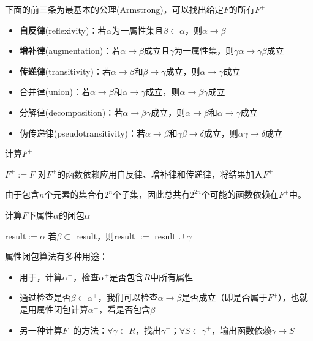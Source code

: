 \begin{theorem}[逻辑蕴含公理]
下面的前三条为最基本的公理(Armstrong)，可以找出给定$F$的所有$F^+$
\begin{itemize}
	\item \textbf{自反律}(reflexivity)：若$\alpha$为一属性集且$\beta\subset\alpha$，则$\alpha\to\beta$
	\item \textbf{增补律}(augmentation)：若$\alpha\to\beta$成立且$\gamma$为一属性集，则$\gamma\alpha\to\gamma\beta$成立
	\item \textbf{传递律}(transitivity)：若$\alpha\to\beta$和$\beta\to\gamma$成立，则$\alpha\to\gamma$成立
	\item 合并律(union)：若$\alpha\to\beta$和$\alpha\to\gamma$成立，则$\alpha\to\beta\gamma$成立
	\item 分解律(decomposition)：若$\alpha\to\beta\gamma$成立，则$\alpha\to\beta$和$\alpha\to\gamma$成立
	\item 伪传递律(pseudotransitivity)：若$\alpha\to\beta$和$\gamma\beta\to\delta$成立，则$\alpha\gamma\to\delta$成立
\end{itemize}
\end{theorem}

\begin{algorithm}
\caption{计算$F^+$}
\begin{algorithmic}[1]
\State $F^+:=F$
\Repeat
\State 对$F^+$的函数依赖应用自反律、增补律和传递律，将结果加入$F^+$
\end{algorithmic}
\end{algorithm}
由于包含$n$个元素的集合有$2^n$个子集，因此总共有$2^{2n}$个可能的函数依赖在$F^+$中。

\begin{algorithm}[H]
\caption{计算$F$下属性$\alpha$的闭包$\alpha^+$}
\begin{algorithmic}[1]
\State result$:=\alpha$
\Repeat
{}
\State 若$\beta\subset$ result，则result $:=$ result $\cup$ $\gamma$
\EndFor
{}
\end{algorithmic}
\end{algorithm}

属性闭包算法有多种用途：
\begin{itemize}
	\item 用于，计算$\alpha^+$，检查$\alpha^+$是否包含$R$中所有属性
	\item 通过检查是否$\beta\subset\alpha^+$，我们可以检查$\alpha\to\beta$是否成立（即是否属于$F^+$），也就是用属性闭包计算$\alpha^+$，看是否包含$\beta$
	\item 另一种计算$F^+$的方法：$\forall\gamma\subset R$，找出$\gamma^+$；$\forall S\subset\gamma^+$，输出函数依赖$\gamma\to S$
\end{itemize}

